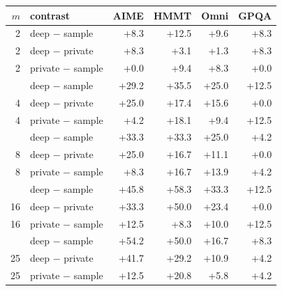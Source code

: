 \begin{tabular}{rlrrrr}
\toprule
$m$ & contrast & AIME & HMMT & Omni & GPQA \\ \midrule
2 & deep $-$ sample & +8.3 & +12.5 & +9.6 & +8.3 \\
2 & deep $-$ private & +8.3 & +3.1 & +1.3 & +8.3 \\
2 & private $-$ sample & +0.0 & +9.4 & +8.3 & +0.0 \\
\addlinespace
4 & deep $-$ sample & +29.2 & +35.5 & +25.0 & +12.5 \\
4 & deep $-$ private & +25.0 & +17.4 & +15.6 & +0.0 \\
4 & private $-$ sample & +4.2 & +18.1 & +9.4 & +12.5 \\
\addlinespace
8 & deep $-$ sample & +33.3 & +33.3 & +25.0 & +4.2 \\
8 & deep $-$ private & +25.0 & +16.7 & +11.1 & +0.0 \\
8 & private $-$ sample & +8.3 & +16.7 & +13.9 & +4.2 \\
\addlinespace
16 & deep $-$ sample & +45.8 & +58.3 & +33.3 & +12.5 \\
16 & deep $-$ private & +33.3 & +50.0 & +23.4 & +0.0 \\
16 & private $-$ sample & +12.5 & +8.3 & +10.0 & +12.5 \\
\addlinespace
25 & deep $-$ sample & +54.2 & +50.0 & +16.7 & +8.3 \\
25 & deep $-$ private & +41.7 & +29.2 & +10.9 & +4.2 \\
25 & private $-$ sample & +12.5 & +20.8 & +5.8 & +4.2 \\
\bottomrule
\end{tabular}
